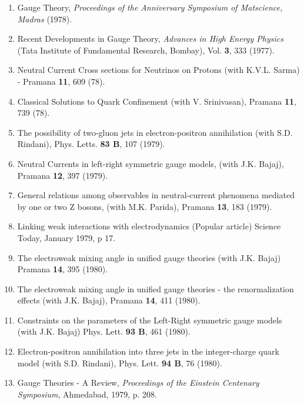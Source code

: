 \begin{enumerate}
\item Gauge Theory, {\it Proceedings of the Anniversary Symposium of
Matscience, Madras} (1978).

\item Recent Developments in Gauge Theory, {\it Advances in High Energy
Physics} (Tata Institute of Fundamental Research, Bombay),
Vol. {\bf 3}, 333 (1977).

\item Neutral Current Cross sections for Neutrinos on Protons (with
K.V.L. Sarma) - Pramana {\bf 11}, 609 (78).

\item Classical Solutions to Quark Confinement (with V. Srinivasan),
Pramana {\bf 11}, 739 (78).

\item The possibility of two-gluon jets in electron-positron
annihilation (with S.D. Rindani), Phys. Letts. {\bf 83 B}, 107 (1979).

\item Neutral Currents in left-right symmetric gauge models, (with J.K.
Bajaj), Pramana {\bf 12}, 397 (1979).

\item General relations among observables in neutral-current phenomena
mediated by one or two Z bosons, (with M.K. Parida), Pramana {\bf 13},
183 (1979).

\item Linking weak interactions with electrodynamics (Popular article)
Science Today, January 1979, p 17.

\item The electroweak mixing angle in unified gauge theories (with J.K.
Bajaj) Pramana {\bf 14}, 395 (1980).

\item The electroweak mixing angle in unified gauge theories - the
renormalization effects (with J.K. Bajaj), Pramana {\bf 14}, 411
(1980).

\item Constraints on the parameters of the Left-Right symmetric gauge
models (with J.K. Bajaj) Phys. Lett. {\bf 93 B}, 461 (1980).

\item Electron-positron annihilation into three jets in the
integer-charge quark model (with S.D. Rindani), Phys. Lett. {\bf 94 B},
76 (1980).

\item Gauge Theories - A Review, {\it Proceedings of the Einstein Centenary
Symposium}, Ahmedabad, 1979, p. 208.


\end{enumerate}
